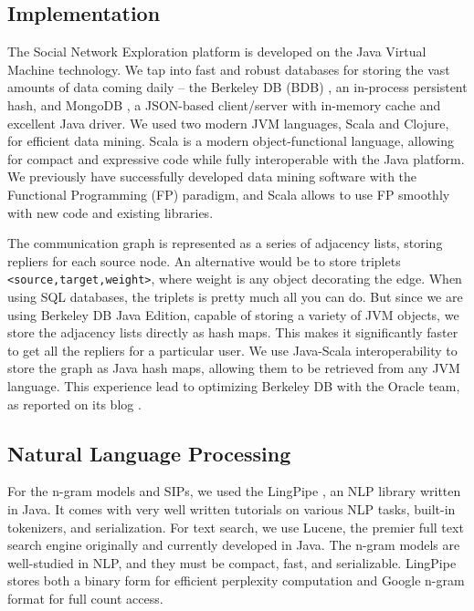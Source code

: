 \subsection{Implementation}

The Social Network Exploration platform is developed on the Java Virtual Machine technology.  We tap into fast and robust databases for storing the vast amounts of data coming daily -- the Berkeley DB (BDB) \cite{BDB}, an in-process persistent hash, and MongoDB \cite{MongoDB}, a JSON-based client/server with in-memory cache and excellent Java driver.  We used two modern JVM languages, Scala and Clojure, for efficient data mining.
Scala is a modern object-functional language, allowing for compact and expressive code while fully interoperable with the Java platform.  We previously have successfully developed data mining software with the Functional Programming (FP) paradigm, and Scala allows to use FP smoothly with new code and existing libraries.

The communication graph is represented as a series of adjacency lists, storing repliers for each source node.  An alternative would be to store triplets \verb|<source,target,weight>|, where weight is any object decorating the edge.  When using SQL databases, the triplets is pretty much all you can do.  But since we are using Berkeley DB Java Edition, capable of storing a variety of JVM objects, we store the adjacency lists directly as hash maps.  This makes it significantly faster to get all the repliers for a particular user.  We use Java-Scala interoperability to store the graph as Java hash maps, allowing them to be retrieved from any JVM language.  This experience lead to optimizing Berkeley DB with the Oracle team, as reported on its blog \cite{OracleBlog}.

\subsection{Natural Language Processing}

For the n-gram models and SIPs, we used the LingPipe \cite{LingPipe}, an NLP library written in Java.  It comes with very well written tutorials on various NLP tasks, built-in tokenizers, and serialization.  For text search, we use Lucene, the premier full text search engine originally and currently developed in Java.  The n-gram models are well-studied in NLP, and they must be compact, fast, and serializable.  LingPipe stores both a binary form for efficient perplexity computation and Google n-gram format for full count access.
